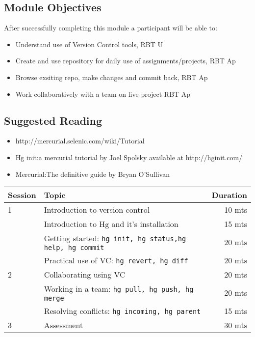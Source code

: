 \documentclass{article}
\begin{document}
\subsection{Module Objectives}
After successfully completing this module a participant will be able to:
        \begin{itemize}
            \item Understand use of Version Control tools, \hfill RBT U
            \item Create and use repository for daily use of assignments/projects, \hfill RBT Ap
            \item Browse exsiting repo, make changes and commit back, \hfill RBT Ap
            \item Work collaboratively with a team on live project \hfill RBT Ap
        \end{itemize}
\subsection{Suggested Reading}
\begin{itemize}
    \item http://mercurial.selenic.com/wiki/Tutorial
    \item Hg init:a mercurial tutorial by Joel Spolsky available at http://hginit.com/
    \item Mercurial:The definitive guide by Bryan O'Sullivan 
\end{itemize}

\begin{tabular}{llr}
\hline
Session & Topic & Duration\\\hline
1 & Introduction to version control                             & 10 mts\\
  & Introduction to Hg and it's installation                    & 15 mts\\
  & Getting started: \tt{hg init, hg status,hg help, hg commit} & 20 mts\\
  & Practical use of VC: \tt{hg revert, hg diff}                & 20 mts\\\hline

2 & Collaborating using VC                                      & 20 mts\\
  & Working in a team: \tt{hg pull, hg push, hg merge}          & 20 mts\\
  & Resolving conflicts: \tt{hg incoming, hg parent}            & 15 mts\\\hline

3 & Assessment                                                  & 30 mts\\\hline\hline
\end{tabular}
\end{document}
